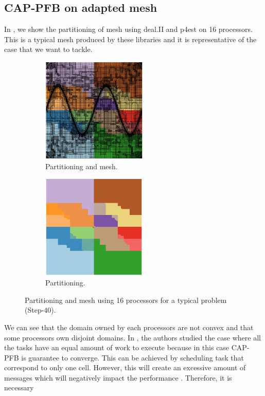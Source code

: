 \documentclass[letterpaper]{article}
\renewcommand{\(}{\left(}
\renewcommand{\)}{\right)}
\renewcommand{\[}{\left[}
\renewcommand{\]}{\right]}
\begin{document}
\subsection{CAP-PFB on adapted mesh}
In , we show the partitioning of mesh using deal.II and p4est 
on 16 processors. This is a typical mesh produced by these libraries and it is
representative of the case that we want to tackle. 
\begin{figure}[H]
  \begin{subfigure}[b]{.5\textwidth}
    \centering
    \includegraphics[width=5cm]{subdomain_id_0}
    \caption{Partitioning and mesh.}
  \end{subfigure}
  \begin{subfigure}[b]{.5\textwidth}
    \centering
    \includegraphics[width=5cm]{subdomain_id_1}
    \caption{Partitioning.}
  \end{subfigure}
  \caption{Partitioning and mesh using 16 processors for a typical problem
  (Step-40).}
  \label{subdomain_id}
\end{figure}
We can see that the domain owned by each processors are not convex and that some
processors own disjoint domains. In \cite{Mo2014}, the authors studied the case
where all the tasks have an equal amount of work to execute because in this case
CAP-PFB is guarantee to converge. This can be achieved by scheduling task that correspond
to only one cell. However, this will create an excessive amount of messages
which will negatively impact the performance \cite{Pautz2002}. Therefore, it is necessary
\end{document}
